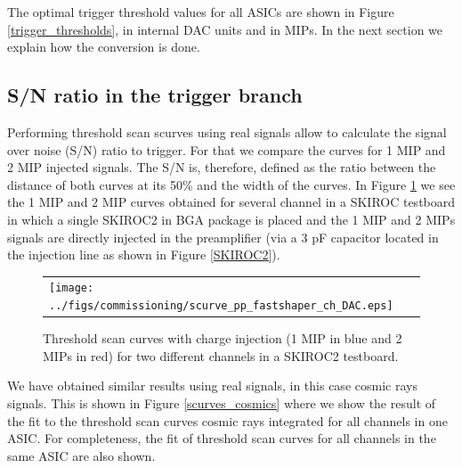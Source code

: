 \documentclass[a4paper,11pt]{article}
\begin{document}
The optimal trigger threshold values for all ASICs are shown in Figure \ref{trigger_thresholds}, in internal DAC units and in MIPs. In the next section we explain how the conversion is done.

\subsection{S/N ratio in the trigger branch}
\label{sec:comm_trigger_sn}

Performing threshold scan scurves using
real signals allow to calculate the signal over noise (S/N) ratio to trigger.
For that we compare the curves for 1 MIP and 2 MIP injected signals.
The S/N is, therefore, defined as the ratio between the distance of both curves at its
50\% and the width of the curves.
In Figure \ref{scurves_injection} we see the 1 MIP and 2 MIP curves obtained for several channel
in a SKIROC testboard in which a single SKIROC2 in BGA package is placed and the 1 MIP and 2 MIPs 
 signals are directly injected in the preamplifier 
(via a 3 pF capacitor located in the injection line as shown in Figure \ref{SKIROC2}). 


\begin{figure}[!t]
    \centering
  \begin{tabular}{l}
	\texttt{[image: ../figs/commissioning/scurve\_pp\_fastshaper\_ch\_DAC.eps]} \\
	\end{tabular}
\caption{Threshold scan curves with charge injection (1 MIP in blue and 2 MIPs in red) for two different channels in a SKIROC2 testboard.}
\label{scurves_injection}
\end{figure}


We have obtained similar results using real signals, in this case cosmic rays signals. This is shown 
in Figure \ref{scurves_cosmics}  where 
we show the result of the fit to the threshold scan curves cosmic rays integrated for all channels
in one ASIC. For completeness, the fit of threshold scan curves for all channels
in the same ASIC are also shown.
\end{document}
